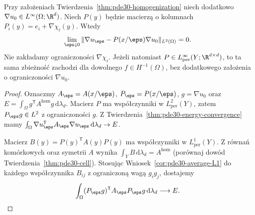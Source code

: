 \begin{twierdzenie}
\label{thm:pde30-corrector-bounded-gradient}
Przy założeniach Twierdzenia~\ref{thm:pde30-homogenization}
niech dodatkowo $\nabla u_0\in L^\infty(\Omega;\R^d)$.
Niech $P(y)$ będzie macierzą o kolumnach
$P_i(y)=e_i+\nabla\chi_i(y)$. Wtedy
\[
 \lim_{\eps\downarrow0}
 \|\nabla u_\eps-P(x/\eps)\nabla u_0\|_{L^2(\Omega)}=0 .
\]
Nie zakładamy ograniczoności $\nabla\chi_i$.
Jeżeli natomiast $P\in L^\infty_{\mathrm{per}}(Y;\R^{d\times d})$,
to ta sama zbieżność zachodzi dla dowolnego
$f\in H^{-1}(\Omega)$, bez dodatkowego założenia
o ograniczoności $\nabla u_0$.
\end{twierdzenie}
\begin{proof}
Oznaczmy $A_\eps=A(x/\eps)$, $P_\eps=P(x/\eps)$,
$g=\nabla u_0$ oraz $E=\int_\Omega
 g^{\mathsf T}A^{\mathrm{hom}}g\,\mathrm d\lambda_d$.
Macierz $P$ ma współczynniki w $L^2_{\mathrm{per}}(Y)$,
zatem $P_\eps g\in L^2$ z ograniczoności $g$.
Z Twierdzenia~\ref{thm:pde30-energy-convergence} mamy
$\int_\Omega\nabla u_\eps^{\mathsf T}A_\eps
\nabla u_\eps\,\mathrm d\lambda_d\to E$.

Macierz $B(y)=P(y)^{\mathsf T}A(y)P(y)$
ma współczynniki w $L^1_{\mathrm{per}}(Y)$.
Z równań komórkowych oraz symetrii $A$ wynika
$\int_Y B\,\mathrm d\lambda_d=A^{\mathrm{hom}}$
(porównaj dowód Twierdzenia~\ref{thm:pde30-cell}).
Stosując Wniosek~\ref{cor:pde30-average-L1}
do każdego współczynnika $B_{ij}$ z ograniczoną
wagą $g_i g_j$, dostajemy
\[
 \int_\Omega(P_\eps g)^{\mathsf T}A_\eps P_\eps g
 \,\mathrm d\lambda_d\longrightarrow E.
\]


\end{proof}
